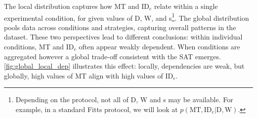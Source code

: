 \documentclass[acmlarge, manuscript,review]{acmart}
\newcommand{\mt}{\ensuremath{{\text{MT}}}\xspace}
\newcommand{\ide}{\ensuremath{{\text{ID}_e}}\xspace}
\newcommand{\D}{\ensuremath{{\text{D}}}\xspace}
\newcommand{\W}{\ensuremath{{\text{W}}}\xspace}
\begin{document}
The local distribution captures how MT and \ide relate within a single experimental condition, for given values of D, W, and s\footnote{Depending on the protocol, not all of D, W and s may be available. For example, in a standard Fitts protocol, we will look at $p(\mt, \ide | \D, \W)$.}. 
The global distribution pools data across conditions and strategies, capturing overall patterns in the dataset. 
These two perspectives lead to different conclusions: within individual conditions, MT and \ide often appear weakly dependent. 
When conditions are aggregated however a global trade-off consistent with the SAT emerges. 
\autoref{fig:global_local_dep} illustrates this effect: locally, dependencies are weak, but globally, high values of MT align with high values of \ide. 
\end{document}
